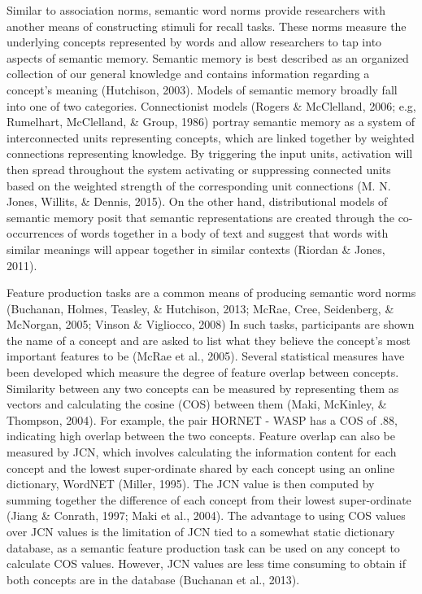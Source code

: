 \documentclass[english,man]{apa6}
\theoremstyle{definition}
\theoremstyle{definition}
\theoremstyle{definition}
\theoremstyle{remark}
\begin{document}
Similar to association norms, semantic word norms provide researchers
with another means of constructing stimuli for recall tasks. These norms
measure the underlying concepts represented by words and allow
researchers to tap into aspects of semantic memory. Semantic memory is
best described as an organized collection of our general knowledge and
contains information regarding a concept's meaning (Hutchison, 2003).
Models of semantic memory broadly fall into one of two categories.
Connectionist models (Rogers \& McClelland, 2006; e.g, Rumelhart,
McClelland, \& Group, 1986) portray semantic memory as a system of
interconnected units representing concepts, which are linked together by
weighted connections representing knowledge. By triggering the input
units, activation will then spread throughout the system activating or
suppressing connected units based on the weighted strength of the
corresponding unit connections (M. N. Jones, Willits, \& Dennis, 2015).
On the other hand, distributional models of semantic memory posit that
semantic representations are created through the co-occurrences of words
together in a body of text and suggest that words with similar meanings
will appear together in similar contexts (Riordan \& Jones, 2011).

Feature production tasks are a common means of producing semantic word
norms (Buchanan, Holmes, Teasley, \& Hutchison, 2013; McRae, Cree,
Seidenberg, \& McNorgan, 2005; Vinson \& Vigliocco, 2008) In such tasks,
participants are shown the name of a concept and are asked to list what
they believe the concept's most important features to be (McRae et al.,
2005). Several statistical measures have been developed which measure
the degree of feature overlap between concepts. Similarity between any
two concepts can be measured by representing them as vectors and
calculating the cosine (COS) between them (Maki, McKinley, \& Thompson,
2004). For example, the pair HORNET - WASP has a COS of .88, indicating
high overlap between the two concepts. Feature overlap can also be
measured by JCN, which involves calculating the information content for
each concept and the lowest super-ordinate shared by each concept using
an online dictionary, WordNET (Miller, 1995). The JCN value is then
computed by summing together the difference of each concept from their
lowest super-ordinate (Jiang \& Conrath, 1997; Maki et al., 2004). The
advantage to using COS values over JCN values is the limitation of JCN
tied to a somewhat static dictionary database, as a semantic feature
production task can be used on any concept to calculate COS values.
However, JCN values are less time consuming to obtain if both concepts
are in the database (Buchanan et al., 2013).
\end{document}
